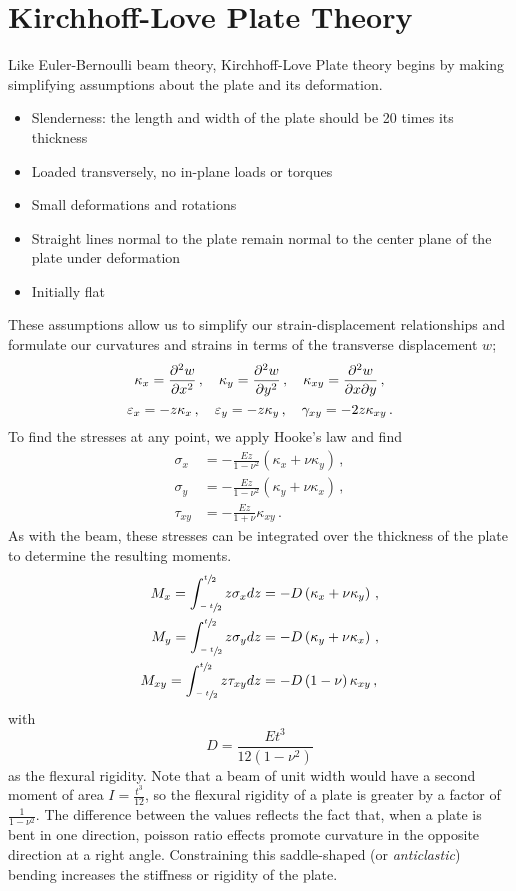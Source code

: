 \section{Kirchhoff-Love Plate Theory}
Like Euler-Bernoulli beam theory, Kirchhoff-Love Plate theory begins by making simplifying assumptions about the plate and its deformation.
\begin{itemize}
 \item Slenderness: the length and width of the plate should be 20 times its thickness
 \item Loaded transversely, no in-plane loads or torques
 \item Small deformations and rotations
 \item Straight lines normal to the plate remain normal to the center plane of the plate under deformation
 \item Initially flat
\end{itemize}
These assumptions allow us to simplify our strain-displacement relationships and formulate our curvatures and strains in terms of the transverse displacement $w$;
\begin{equation}
    \kappa_x=\frac{\partial^2 w}{\partial x^2}\,, \quad \kappa_y= \frac{\partial^2 w}{\partial y^2}\,, \quad \kappa_{xy}=\frac{\partial^2 w}{\partial x\partial y}\,,\notag
\end{equation}
\begin{equation}
\varepsilon_x = -z \kappa_x\,, \quad \varepsilon_y = -z \kappa_y\,, \quad \gamma_{xy} = -2 z \kappa_{xy}\,. \notag
\end{equation}
To find the stresses at any point, we apply Hooke's law and find
\begin{align*}
\sigma_x &= -\frac{E z}{1-\nu^2}\left(\kappa_x+\nu\kappa_y\right)\, ,\\
\sigma_y &= -\frac{E z}{1-\nu^2}\left(\kappa_y+\nu\kappa_x\right)\, ,\\
\tau_{xy} &= -\frac{Ez}{1+\nu}\kappa_{xy}\, .
\end{align*}
As with the beam, these stresses can be integrated over the thickness of the plate to determine the resulting moments.
\begin{align*}
M_x = \int_{\sfrac{-t}{2}}^{\sfrac{t}{2}}z\sigma_x dz &=-D\left(\kappa_x+\nu\kappa_y\right)\, ,\\
M_y = \int_{\sfrac{-t}{2}}^{\sfrac{t}{2}}z\sigma_y dz &=-D\left(\kappa_y+\nu\kappa_x\right)\, ,\\
M_{xy} = \int_{\sfrac{-t}{2}}^{\sfrac{t}{2}}z\tau_{xy}dz &= -D\left(1-\nu\right)\kappa_{xy}\, ,
\end{align*}
with
\begin{equation*}
D=\frac{Et^3}{12\left(1-\nu^2\right)}
\end{equation*}
as the flexural rigidity.
Note that a beam of unit width would have a second moment of area $I = \frac{t^3}{12}$, so the flexural rigidity of a plate is greater by a factor of $\frac{1}{1-\nu^2}$.
The difference between the values reflects the fact that, when a plate is bent in one direction, poisson ratio effects promote curvature in the opposite direction at a right angle.
Constraining this saddle-shaped (or \textit{anticlastic}) bending increases the stiffness or rigidity of the plate.

